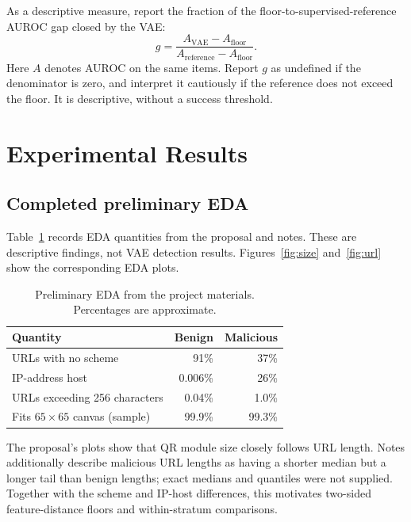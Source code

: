 \documentclass{article}
\begin{document}
As a descriptive measure, report the fraction of the floor-to-supervised-reference AUROC gap closed by the VAE:
\begin{equation}
g=\frac{A_{\mathrm{VAE}}-A_{\mathrm{floor}}}{A_{\mathrm{reference}}-A_{\mathrm{floor}}}.
\end{equation}
Here $A$ denotes AUROC on the same items.
Report $g$ as undefined if the denominator is zero, and interpret it cautiously if the reference does not exceed the floor.
It is descriptive, without a success threshold.

\section{Experimental Results}

\subsection{Completed preliminary EDA}
Table~\ref{tab:eda} records EDA quantities from the proposal and notes.
These are descriptive findings, not VAE detection results.
Figures~\ref{fig:size} and~\ref{fig:url} show the corresponding EDA plots.

\begin{table}[t]
\centering
\caption{Preliminary EDA from the project materials. Percentages are approximate.}
\label{tab:eda}
\small
\begin{tabular}{lrr}
\toprule
Quantity & Benign & Malicious \\
\midrule
URLs with no scheme & 91\% & 37\% \\
IP-address host & 0.006\% & 26\% \\
URLs exceeding 256 characters & 0.04\% & 1.0\% \\
Fits $65\times65$ canvas (sample) & 99.9\% & 99.3\% \\
\bottomrule
\end{tabular}
\end{table}

The proposal's plots show that QR module size closely follows URL length.
Notes additionally describe malicious URL lengths as having a shorter median but a longer tail than benign lengths; exact medians and quantiles were not supplied.
Together with the scheme and IP-host differences, this motivates two-sided feature-distance floors and within-stratum comparisons.
\end{document}
